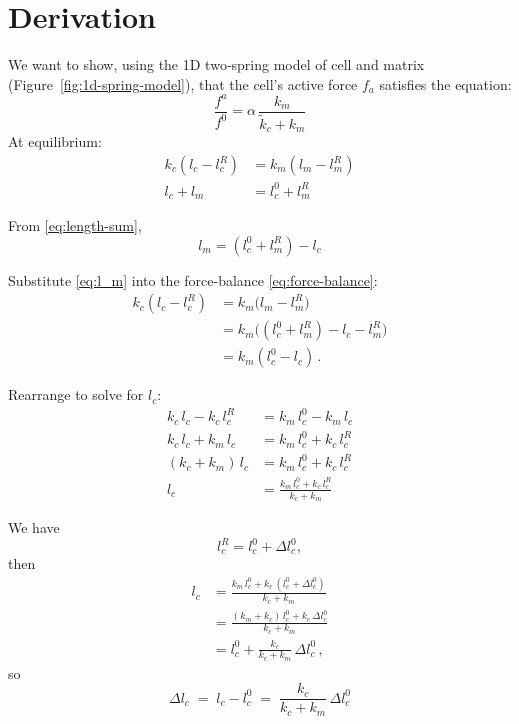 \documentclass{article}
\begin{document}
\section*{Derivation}

We want to show, using the 1D two‐spring model of cell and matrix (Figure~\ref{fig:1d-spring-model}),
that the cell’s active force \(f_a\) satisfies the equation:
\[
\frac{f^{a}}{f^{0}} = \alpha \,\frac{k_{m}}{\tilde{k}_{c} + k_{m}}
\]
At equilibrium:
\begin{align}
  k_c (l_c - l_c^R) &= k_m (l_m - l_m^R)  \label{eq:force-balance}\\
  l_c + l_m         &= l_c^0 + l_m^R      \label{eq:length-sum}
\end{align}

From \eqref{eq:length-sum}, 
\begin{equation}\label{eq:l_m}
  l_m = (l_c^0 + l_m^R) - l_c
\end{equation}

Substitute \eqref{eq:l_m} into the force-balance \eqref{eq:force-balance}:
\begin{align*}
  k_c (l_c - l_c^R)
  &= k_m \bigl(l_m - l_m^R\bigr) \nonumber\\
  &= k_m\bigl((l_c^0 + l_m^R) - l_c - l_m^R\bigr)\nonumber\\
  &= k_m (l_c^0 - l_c)\,. 
\end{align*}

Rearrange to solve for \(l_c\):
\begin{align*}
  k_c\,l_c - k_c\,l_c^R       &= k_m\,l_c^0 - k_m\,l_c \nonumber\\
  k_c\,l_c + k_m\,l_c         &= k_m\,l_c^0 + k_c\,l_c^R \nonumber\\
  (k_c + k_m)\,l_c            &= k_m\,l_c^0 + k_c\,l_c^R \nonumber\\
  l_c                         &= \frac{k_m\,l_c^0 + k_c\,l_c^R}{k_c + k_m}
\end{align*}

We have
\[
  l_c^R = l_c^0 + \Delta l_c^0,
\]
then
\begin{align*}
  l_c
  &= \frac{k_m\,l_c^0 + k_c\,(l_c^0 + \Delta l_c^0)}{k_c + k_m}\nonumber\\
  &= \frac{(k_m + k_c)\,l_c^0 + k_c\,\Delta l_c^0}{k_c + k_m}\nonumber\\
  &= l_c^0 + \frac{k_c}{k_c + k_m}\,\Delta l_c^0\,,
\end{align*}
so
\[
  \Delta l_c \;=\; l_c - l_c^0 \;=\; \frac{k_c}{k_c + k_m}\,\Delta l_c^0
\]
\end{document}

